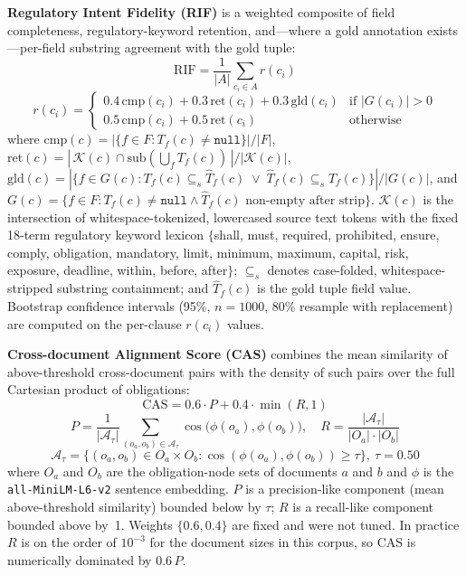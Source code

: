 \documentclass{article}
\begin{document}
\textbf{Regulatory Intent Fidelity (RIF)}
is a weighted composite of field completeness, regulatory-keyword
retention, and---where a gold annotation exists---per-field
substring agreement with the gold tuple:
\begin{equation}
\text{RIF} = \frac{1}{|A|} \sum_{c_i \in A} r(c_i)
\label{eq:rif}
\end{equation}
\begin{equation}
r(c_i) =
\begin{cases}
0.4\,\mathrm{cmp}(c_i) + 0.3\,\mathrm{ret}(c_i) + 0.3\,\mathrm{gld}(c_i)
  & \text{if } |G(c_i)| > 0\\
0.5\,\mathrm{cmp}(c_i) + 0.5\,\mathrm{ret}(c_i)
  & \text{otherwise}
\end{cases}
\label{eq:rif_r}
\end{equation}
where
$\mathrm{cmp}(c) = |\{f \in F : T_f(c) \neq \texttt{null}\}| / |F|$,
\;
$\mathrm{ret}(c) = |\,\mathcal{K}(c) \cap \mathrm{sub}(\textstyle\bigcup_f T_f(c))\,| / |\mathcal{K}(c)|$,
\;
$\mathrm{gld}(c) = |\{f \in G(c) : T_f(c) \subseteq_s \hat{T}_f(c) \;\lor\; \hat{T}_f(c) \subseteq_s T_f(c)\}| / |G(c)|$,
\;
and $G(c) = \{f \in F : T_f(c) \neq \texttt{null} \land \hat{T}_f(c)\text{ non-empty after strip}\}$.
$\mathcal{K}(c)$ is the intersection of whitespace-tokenized, lowercased
source text tokens with the fixed 18-term regulatory keyword lexicon
$\{$shall, must, required, prohibited, ensure, comply, obligation,
mandatory, limit, minimum, maximum, capital, risk, exposure, deadline,
within, before, after$\}$;
$\subseteq_s$ denotes case-folded, whitespace-stripped substring
containment; and
$\hat{T}_f(c)$ is the gold tuple field value.
Bootstrap confidence intervals (95\%, $n=1000$, 80\% resample with
replacement) are computed on the per-clause $r(c_i)$ values.

\textbf{Cross-document Alignment Score (CAS)}
combines the mean similarity of above-threshold cross-document pairs
with the density of such pairs over the full Cartesian product of
obligations:
\begin{equation}
\text{CAS} = 0.6 \cdot P + 0.4 \cdot \min\!\left(R, 1\right)
\label{eq:cas}
\end{equation}
\begin{equation}
P = \frac{1}{|\mathcal{A}_\tau|} \sum_{(o_a, o_b) \in \mathcal{A}_\tau}
  \cos\!\bigl(\phi(o_a), \phi(o_b)\bigr),
\quad
R = \frac{|\mathcal{A}_\tau|}{|O_a| \cdot |O_b|}
\label{eq:cas_pr}
\end{equation}
\begin{equation}
\mathcal{A}_\tau =
  \bigl\{(o_a, o_b) \in O_a \times O_b :
    \cos(\phi(o_a), \phi(o_b)) \geq \tau\bigr\},\ \tau = 0.50
\end{equation}
where $O_a$ and $O_b$ are the obligation-node sets of documents $a$
and $b$ and $\phi$ is the \texttt{all-MiniLM-L6-v2} sentence embedding.
$P$ is a precision-like component (mean above-threshold similarity)
bounded below by $\tau$; $R$ is a recall-like component bounded above
by~1.
Weights $\{0.6, 0.4\}$ are fixed and were not tuned.
In practice $R$ is on the order of $10^{-3}$ for the document sizes in
this corpus, so CAS is numerically dominated by $0.6\,P$.
\end{document}
